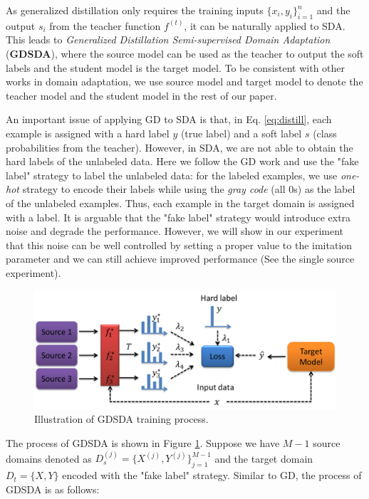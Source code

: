 As generalized distillation only requires the training inputs $\{x_i,y_i\}_{i=1}^n$ and the output $s_i$ from the teacher function $f^{(t)}$, it can be naturally applied to SDA. This leads to \textit{Generalized Distillation Semi-supervised Domain Adaptation} (\textbf{GDSDA}), where the source model can be used as the teacher to output the soft labels and the student model is the target model. To be consistent with other works in domain adaptation, we use source model and target model to denote the teacher model and the student model in the rest of our paper.

An important issue of applying GD to SDA is that, in Eq. \eqref{eq:distill}, each example is assigned with a hard label $y$ (true label) and a soft label $s$ (class probabilities from the teacher). However, in SDA, we are not able to obtain the hard labels of the unlabeled data. Here we follow the GD work\cite{lopez2015unifying} and use the "fake label" strategy to label the unlabeled data: for the labeled examples, we use \textit{one-hot} strategy to encode their labels while using the \textit{gray code} (all 0s) as the label of the unlabeled examples. Thus, each example in the target domain is assigned with a label. It is arguable that the "fake label" strategy would introduce extra noise and degrade the performance. However, we will show in our experiment that this noise can be well controlled by setting a proper value to the imitation parameter and we can still achieve improved performance (See the single source experiment).
\begin{figure}
	\centering
	\includegraphics[scale=.4]{figure/multi-GDDA.png}
	\caption{Illustration of GDSDA training process.}
	\label{fig:GDSDA}
\end{figure}
The process of GDSDA is shown in Figure \ref{fig:GDSDA}. Suppose we have $M-1$ source domains denoted as $D_s^{(j)}=\{X^{(j)},Y^{(j)}\}_{j=1}^{M-1}$ and the target domain $D_t=\{X,Y\}$ encoded with the "fake label" strategy. Similar to GD, the process of GDSDA is as follows:
